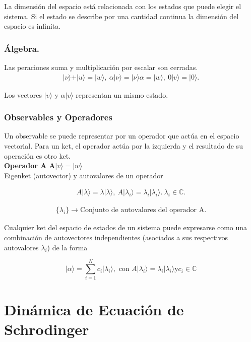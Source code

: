 \documentclass{report}
\begin{document}
La dimensión del espacio está relacionada con los estados que puede elegir el sistema. Si el estado se describe por una cantidad continua la dimensión del espacio es infinita.

\subsubsection{Álgebra.} Las peraciones suma y multiplicación por escalar son cerradas.
\begin{align*}
    \vert \nu \rangle+ \vert u \rangle = \vert w \rangle,  \ \alpha\vert\nu\rangle=\vert\nu\rangle\alpha=\vert w \rangle, \ 0\vert v \rangle = \vert 0 \rangle.
\end{align*}

    Los vectores $\vert v \rangle$ y $\alpha \vert v \rangle$ representan un mismo estado.


\subsubsection*{Observables y Operadores}
Un observable se puede representar por un operador que actúa en el espacio vectorial. Para un ket, el operador actúa por la izquierda y el resultado de su operación es otro ket.\\
\textbf{Operador A} $\mathbf{A} \vert v \rangle=\vert w \rangle$\\
Eigenket (autovector) y autovalores de un operador 

\begin{align*}
    A \vert \lambda \rangle = \lambda \vert \lambda \rangle, \ A\vert\lambda_i\rangle= \lambda_i\vert\lambda_i\rangle. \ \lambda_i \in \mathbb{C}.
\end{align*}

\begin{gather*}
  \{ \lambda_i\} \rightarrow \text{Conjunto de autovalores del operador A.} 
\end{gather*}

Cualquier ket del espacio de estados de un sistema puede expresarse como una combinación de autovectores independientes (asociados a sus respectivos autovalores ${\lambda_i}$) de la forma

$$\vert \alpha \rangle = \sum_{i=1}^{N} c_i \vert \lambda_i \rangle, \text{ con } A \vert\lambda_i\rangle=\lambda_i\vert\lambda_i\rangle \text{y}  c_i \in \mathbb{C}$$





\section{Dinámica de Ecuación de Schrodinger}
\end{document}
